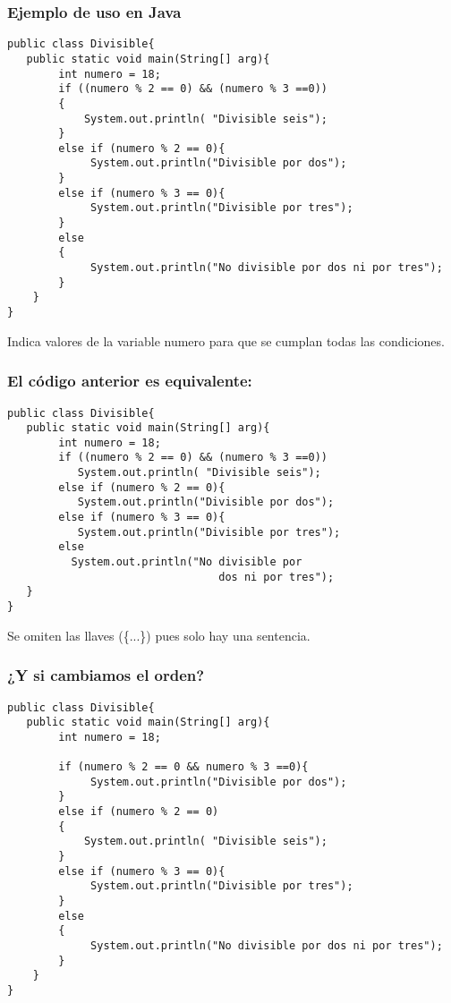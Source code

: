 \documentclass{beamer}
\begin{document}
\begin{frame}[fragile]
    \frametitle{Ejemplo de uso en Java}
\begin{scriptsize}
\begin{verbatim}
public class Divisible{
   public static void main(String[] arg){
        int numero = 18;
        if ((numero % 2 == 0) && (numero % 3 ==0))
        {
            System.out.println( "Divisible seis");
        }
        else if (numero % 2 == 0){
             System.out.println("Divisible por dos");
        }
        else if (numero % 3 == 0){
             System.out.println("Divisible por tres");
        }
        else
        {
             System.out.println("No divisible por dos ni por tres");
        }
    }
}
\end{verbatim} 
\end{scriptsize}
\pause
Indica valores de la variable numero para que se cumplan todas las condiciones.
\end{frame}

\begin{frame}[fragile]
\frametitle{El código anterior es equivalente:}
\begin{verbatim}
public class Divisible{
   public static void main(String[] arg){
        int numero = 18;
        if ((numero % 2 == 0) && (numero % 3 ==0))
           System.out.println( "Divisible seis");
        else if (numero % 2 == 0){
           System.out.println("Divisible por dos");
        else if (numero % 3 == 0){
           System.out.println("Divisible por tres");
        else
          System.out.println("No divisible por 
                                 dos ni por tres");
   }
}
\end{verbatim}
\pause
Se omiten las llaves (\{...\}) pues solo hay una sentencia.
\end{frame}



\begin{frame}[fragile]
    \frametitle{¿Y si cambiamos el orden?}
\begin{scriptsize}
\begin{verbatim}
public class Divisible{
   public static void main(String[] arg){
        int numero = 18;
        
        if (numero % 2 == 0 && numero % 3 ==0){
             System.out.println("Divisible por dos");
        }
        else if (numero % 2 == 0)
        {
            System.out.println( "Divisible seis");
        }
        else if (numero % 3 == 0){
             System.out.println("Divisible por tres");
        }
        else
        {
             System.out.println("No divisible por dos ni por tres");
        }
    }
}
\end{verbatim} 
\end{scriptsize}
\end{frame}
\end{document}
